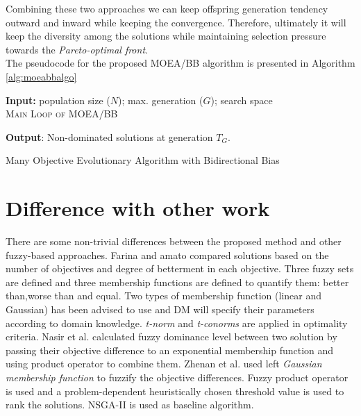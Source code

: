 \documentclass[journal]{IEEEtran}
\begin{document}
Combining these two approaches we can keep offspring generation tendency outward and inward while keeping the convergence. Therefore, ultimately it will keep the diversity among the solutions while maintaining selection pressure towards the \textit{Pareto-optimal front}.\\

The pseudocode for the proposed MOEA/BB algorithm is presented in Algorithm \ref{alg:moeabbalgo}

\begin{algorithm}[!h]
\textbf{Input:} population size ($N$); max. generation ($G$); search space\\
\textsc{Main Loop of MOEA/BB}
\begin{algorithmic}[1]
\end{algorithmic}
\textbf{Output}: Non-dominated solutions at generation $T_G$.
\caption{Many Objective Evolutionary Algorithm with Bidirectional Bias}
\label{alg:moeabbalgo}
\end{algorithm}


\section{Difference with other work}

There are some non-trivial differences between the proposed method and other fuzzy-based approaches. Farina and amato \cite{farina2004fuzzy} compared solutions based on the number of objectives and degree of betterment in each objective. Three fuzzy sets are defined and three membership functions are defined to quantify them: better than,worse than and equal. Two types of membership function (linear and Gaussian) has been advised to use and DM will specify their parameters according to domain knowledge. \textit{t-norm} and \textit{t-conorms} are applied in optimality criteria. Nasir et al. \cite{5949696} calculated fuzzy dominance level between two solution by passing their objective difference to an exponential membership function and using product operator to combine them. Zhenan et al. \cite{he2014fuzzy} used left \textit{Gaussian membership function} to fuzzify the objective differences. Fuzzy product operator is used and a problem-dependent heuristically chosen threshold value is used to rank the solutions. NSGA-II is used as baseline algorithm. 
\end{document}
